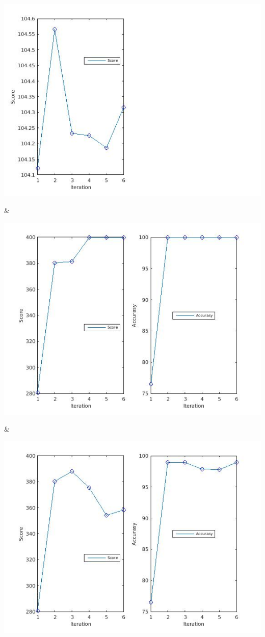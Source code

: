 \documentclass[
	fontsize=12pt,
	paper=a4,
	twoside=false,
	numbers=noenddot,
	plainheadsepline,
	toc=listof,
	toc=bibliography
]{scrartcl}
\begin{document}
\begin{landscape}
\begin{table}
\begin{tabular}
		\parbox[b]{1em}{
			\includegraphics[scale = 0.28]{fig/method2/test1/accuracy_HL.jpg}}  &
		\parbox[b]{1em}{
			\includegraphics[scale = 0.28]{fig/method1/test1/accuracy_LL.jpg}}  &
		\parbox[b]{1em}{
			\includegraphics[scale = 0.28]{fig/method2/test1/accuracy_LL.jpg}} \\
		\hline	
		

\end{tabular}
\end{table}
\end{landscape}
\end{document}
